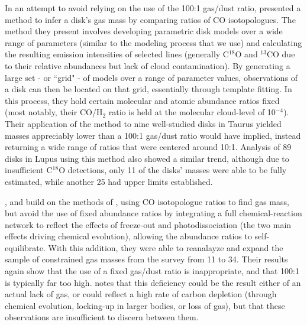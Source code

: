 In an attempt to avoid relying on the use of the 100:1 gas/dust ratio, \citet{WilliamsBest2014} presented a method to infer a disk's gas mass by comparing ratios of CO isotopologues. The method they present involves developing parametric disk models over a wide range of parameters (similar to the modeling process that we use) and calculating the resulting emission intensities of selected lines (generally C$^{18}$O and $^{13}$CO due to their relative abundances but lack of cloud contamination). By generating a large set - or ``grid" - of models over a range of parameter values, observations of a disk can then be located on that grid, essentially through template fitting. In this process, they hold certain molecular and atomic abundance ratios fixed (most notably, their CO/H$_2$ ratio is held at the molecular cloud-level of 10$^{-4}$). Their application of the method to nine well-studied disks in Taurus yielded masses appreciably lower than a 100:1 gas/dust ratio would have implied, instead returning a wide range of ratios that were centered around 10:1. Analysis of 89 disks in Lupus \citep{Ansdell2016} using this method also showed a similar trend, although due to insufficient C$^{18}$O detections, only 11 of the disks' masses were able to be fully estimated, while another 25 had upper limits established.

\citet{Miotello2014}, \citet{Miotello2016} and \citet{Miotello2017} build on the methods of \citet{WilliamsBest2014}, using CO isotopologue ratios to find gas mass, but avoid the use of fixed abundance ratios by integrating a full chemical-reaction network to reflect the effects of freeze-out and photodissociation (the two main effects driving chemical evolution), allowing the abundance ratios to self-equilibrate. With this addition, they were able to reanalayze and expand the sample of constrained gas masses from the \citet{Ansdell2016} survey from 11 to 34. Their results again show that the use of a fixed gas/dust ratio is inappropriate, and that 100:1 is typically far too high. \citet{Miotello2017} notes that this deficiency could be the result either of an actual lack of gas, or could reflect a high rate of carbon depletion (through chemical evolution, locking-up in larger bodies, or loss of gas), but that these observations are insufficient to discern between them.



